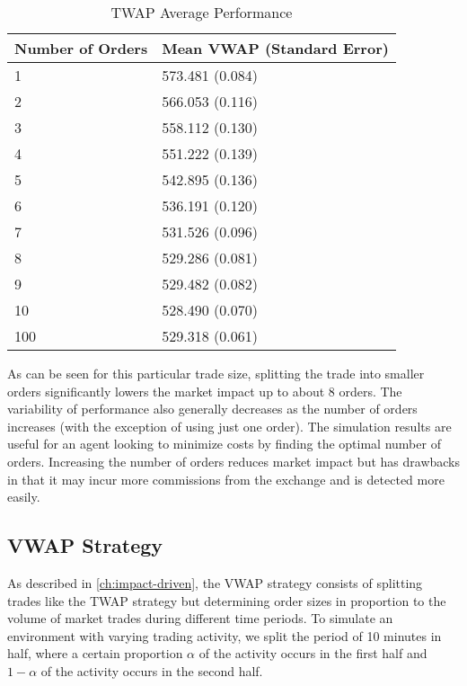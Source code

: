 \begin{table}[htbp]
\begin{center}
\caption{TWAP Average Performance} \label{tab:twap_strategy}
\begin{tabular}{l|l}
\hline \hline
Number of Orders & Mean VWAP (Standard Error) \\
\hline
1                & 573.481 (0.084)            \\
2                & 566.053 (0.116)            \\
3                & 558.112 (0.130)            \\
4                & 551.222 (0.139)            \\
5                & 542.895 (0.136)            \\
6                & 536.191 (0.120)            \\
7                & 531.526 (0.096)            \\
8                & 529.286 (0.081)            \\
9                & 529.482 (0.082)            \\
10               & 528.490 (0.070)            \\
100              & 529.318 (0.061)           
\end{tabular}
\end{center}
\end{table}

As can be seen for this particular trade size, splitting the trade into smaller orders significantly lowers the market impact up to  about 8 orders. The variability of performance also generally decreases as the number of orders increases (with the exception of using just one order). The simulation results are useful for an agent looking to minimize costs by finding the optimal number of orders. Increasing the number of orders reduces market impact but has drawbacks in that it may incur more commissions from the exchange and is detected more easily. 

\subsection{VWAP Strategy}
As described in \ref{ch:impact-driven}, the VWAP strategy consists of splitting trades like the TWAP strategy but determining order sizes in proportion to the volume of market trades during different time periods. To simulate an environment with varying trading activity, we split the period of 10 minutes in half, where a certain proportion $\alpha$ of the activity occurs in the first half and $1-\alpha$ of the activity occurs in the second half. 

